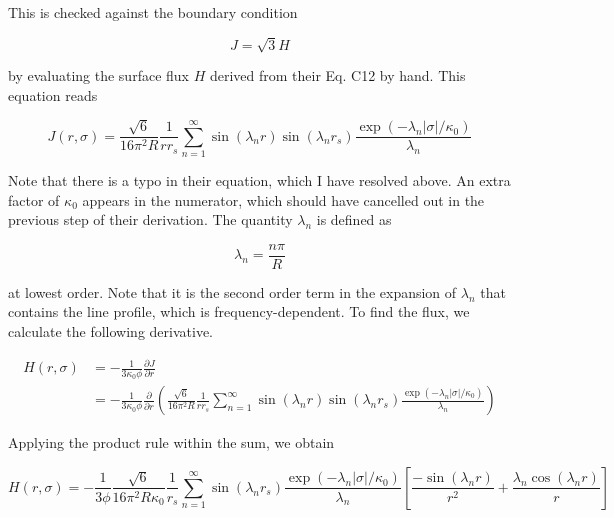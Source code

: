 \documentclass[onecolumn]{aastex63}
\begin{document}
\noindent This is checked against the boundary condition

\begin{equation} \label{bc}
    J = \sqrt{3} H
\end{equation}

\noindent by evaluating the surface flux $H$ derived from their Eq. C12 by hand. This equation reads 

\begin{equation} \label{c12}
    J(r, \sigma) = \frac{\sqrt{6}}{16 \pi^2 R} \frac{1}{rr_s} \sum_{n=1}^{\infty}\sin(\lambda_n r) \sin(\lambda_n r_s) \frac{\exp{(-\lambda_n |\sigma|/\kappa_0)}}{\lambda_n}
\end{equation}

Note that there is a typo in their equation, which I have resolved above. An extra factor of $\kappa_0$ appears in the numerator, which should have cancelled out in the previous step of their derivation. The quantity $\lambda_n$ is defined as 

\begin{equation} \label{lambdan}
    \lambda_n = \frac{n\pi}{R}
\end{equation}

\noindent at lowest order. Note that it is the second order term in the expansion of $\lambda_n$ that contains the line profile, which is frequency-dependent. To find the flux, we calculate the following derivative.

\begin{equation}
    \begin{split}
    H(r, \sigma) &= - \frac{1}{3\kappa_0 \phi}\frac{\partial J}{\partial r}\\
    &= - \frac{1}{3\kappa_0 \phi}\frac{\partial}{\partial r}\left(\frac{\sqrt{6}}{16 \pi^2 R} \frac{1}{rr_s} \sum_{n=1}^{\infty}\sin(\lambda_n r) \sin(\lambda_n r_s) \frac{\exp{(-\lambda_n |\sigma|/\kappa_0)}}{\lambda_n}\right)
    \end{split}
\end{equation}

\noindent Applying the product rule within the sum, we obtain

\begin{equation}
    H(r, \sigma) = - \frac{1}{3 \phi} \frac{\sqrt{6}}{16 \pi^2 R \kappa_0} \frac{1}{r_s} \sum_{n=1}^{\infty} \sin(\lambda_n r_s) \frac{\exp{(-\lambda_n |\sigma|/\kappa_0)}}{\lambda_n} \left[ \frac{-\sin(\lambda_n r)}{r^2} + \frac{\lambda_n \cos(\lambda_n r)}{r}\right]
\end{equation}
\end{document}
